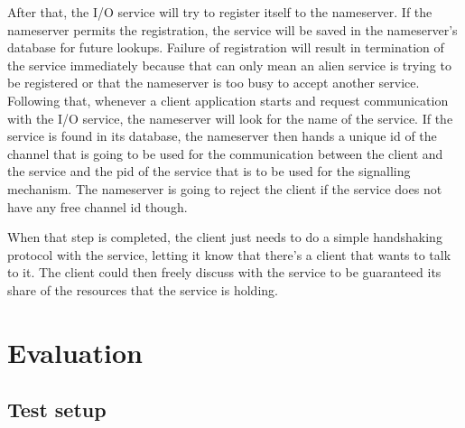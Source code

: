 \documentclass[letterpaper,twocolumn,10pt]{article}
\begin{document}
After that, the I/O service will try to register itself to the nameserver. If the nameserver permits the registration, the service will be saved in the nameserver's database for future lookups. Failure of registration will result in termination of the service immediately because that can only mean an alien service is trying to be registered or that the nameserver is too busy to accept another service. Following that, whenever a client application starts and request communication with the I/O service, the nameserver will look for the name of the service. If the service is found in its database, the nameserver then hands a unique id of the channel that is going to be used for the communication between the client and the service and the pid of the service that is to be used for the signalling mechanism. The nameserver is going to reject the client if the service does not have any free channel id though.

When that step is completed, the client just needs to do a simple handshaking protocol with the service, letting it know that there's a client that wants to talk to it. The client could then freely discuss with the service to be guaranteed its share of the resources that the service is holding.

\section{Evaluation}

\subsection{Test setup}
\end{document}
